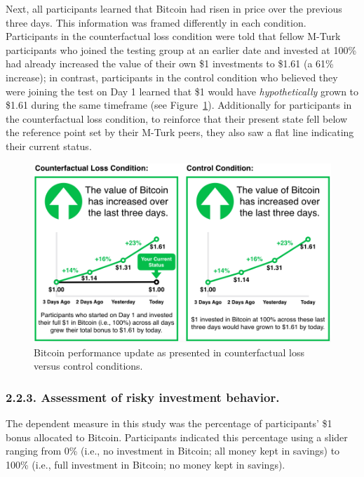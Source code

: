 \documentclass[man,floatsintext]{apa6}
\begin{document}
Next, all participants learned that Bitcoin had risen in price over the previous three days. This information was framed differently in each condition. Participants in the counterfactual loss condition were told that fellow M-Turk participants who joined the testing group at an earlier date and invested at 100\% had already increased the value of their own \$1 investments to \$1.61 (a 61\% increase); in contrast, participants in the control condition who believed they were joining the test on Day 1 learned that \$1 would have \emph{hypothetically} grown to \$1.61 during the same timeframe (see Figure~\ref{fig:manip}). Additionally for participants in the counterfactual loss condition, to reinforce that their present state fell below the reference point set by their M-Turk peers, they also saw a flat line indicating their current status.

\begin{figure}

{\centering \includegraphics[width=0.9\linewidth,height=0.9\textheight]{../img/manip} 

}

\caption{Bitcoin performance update as presented in counterfactual loss versus control conditions.}\label{fig:manip}
\end{figure}

\hypertarget{assessment-of-risky-investment-behavior.}{%
\subsubsection{2.2.3. Assessment of risky investment behavior.}\label{assessment-of-risky-investment-behavior.}}

The dependent measure in this study was the percentage of participants' \$1 bonus allocated to Bitcoin. Participants indicated this percentage using a slider ranging from 0\% (i.e., no investment in Bitcoin; all money kept in savings) to 100\% (i.e., full investment in Bitcoin; no money kept in savings).
\end{document}
